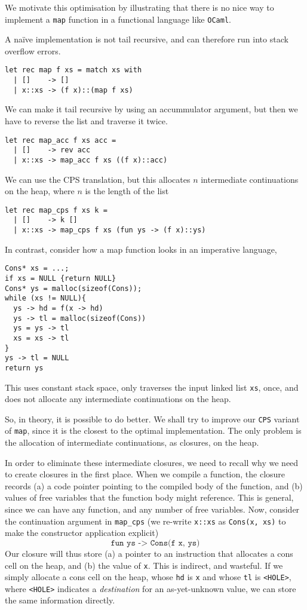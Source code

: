 We motivate this optimisation by illustrating that there is no nice way to implement a \texttt{map} function in a functional language like \texttt{OCaml}. 

A naïve implementation is not tail recursive, and can therefore run into stack overflow errors.
\begin{verbatim}
let rec map f xs = match xs with
  | []    -> []
  | x::xs -> (f x)::(map f xs)
\end{verbatim}
We can make it tail recursive by using an accummulator argument, but then we have to reverse the list and traverse it twice. 
\begin{verbatim}
let rec map_acc f xs acc =
  | []    -> rev acc
  | x::xs -> map_acc f xs ((f x)::acc)
\end{verbatim}
We can use the CPS translation, but this allocates $n$ intermediate continuations on the heap, where $n$ is the length of the list
\begin{verbatim}
let rec map_cps f xs k =
  | []    -> k []
  | x::xs -> map_cps f xs (fun ys -> (f x)::ys)
\end{verbatim}

In contrast, consider how a map function looks in an imperative language,
\begin{verbatim}
Cons* xs = ...;
if xs = NULL {return NULL}
Cons* ys = malloc(sizeof(Cons));
while (xs != NULL){
  ys -> hd = f(x -> hd)
  ys -> tl = malloc(sizeof(Cons))
  ys = ys -> tl
  xs = xs -> tl
}
ys -> tl = NULL
return ys
\end{verbatim}
This uses constant stack space, only traverses the input linked list \texttt{xs}, once, and does not allocate any intermediate continuations on the heap. 

So, in theory, it is possible to do better. We shall try to improve our \texttt{CPS} variant of \texttt{map}, since it is the closest to the optimal implementation. The only problem is the allocation of intermediate continuations, as closures, on the heap. 

In order to eliminate these intermediate closures, we need to recall why we need to create closures in the first place. When we compile a function, the closure records (a) a code pointer pointing to the compiled body of the function, and (b) values of free variables that the function body might reference. This is general, since we can have any function, and any number of free variables. Now, consider the continuation argument in \texttt{map\_cps} (we re-write \texttt{x::xs} as \texttt{Cons(x, xs)} to make the constructor application explicit)
\[\texttt{fun ys -> Cons(f x, ys)}\]
Our closure will thus store (a) a pointer to an instruction that allocates a cons cell on the heap, and (b) the value of \texttt{x}. This is indirect, and wasteful. If we simply allocate a cons cell on the heap, whose \texttt{hd} is \texttt{x} and whose \texttt{tl} is \texttt{<HOLE>}, where \texttt{<HOLE>} indicates a \textit{destination} for an as-yet-unknown value, we can store the same information directly. 

